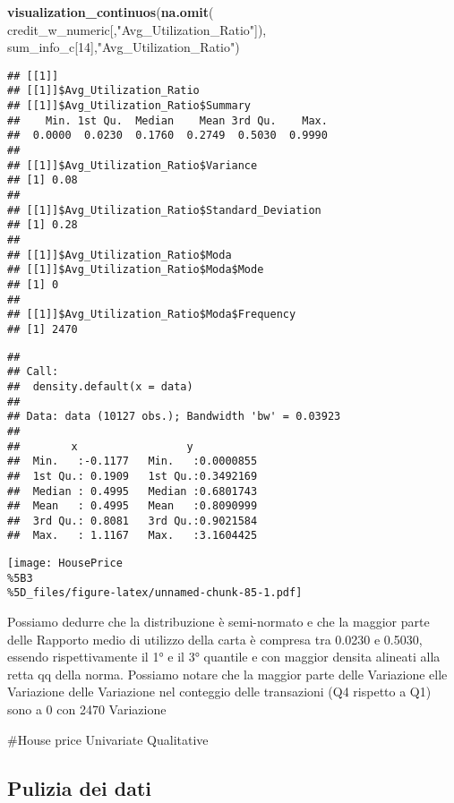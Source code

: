 \documentclass[
]{article}
\newenvironment{Shaded}{\begin{snugshade}}{\end{snugshade}}
\newcommand{\DecValTok}[1]{\textcolor[rgb]{0.00,0.00,0.81}{#1}}
\newcommand{\FunctionTok}[1]{\textcolor[rgb]{0.13,0.29,0.53}{\textbf{#1}}}
\newcommand{\NormalTok}[1]{#1}
\newcommand{\StringTok}[1]{\textcolor[rgb]{0.31,0.60,0.02}{#1}}
\begin{document}
\begin{Shaded}
\begin{Highlighting}[]
\FunctionTok{visualization\_continuos}\NormalTok{(}\FunctionTok{na.omit}\NormalTok{(}
\NormalTok{  credit\_w\_numeric[,}\StringTok{"Avg\_Utilization\_Ratio"}\NormalTok{]), sum\_info\_c[}\DecValTok{14}\NormalTok{],}\StringTok{"Avg\_Utilization\_Ratio"}\NormalTok{)}
\end{Highlighting}
\end{Shaded}

\begin{verbatim}
## [[1]]
## [[1]]$Avg_Utilization_Ratio
## [[1]]$Avg_Utilization_Ratio$Summary
##    Min. 1st Qu.  Median    Mean 3rd Qu.    Max. 
##  0.0000  0.0230  0.1760  0.2749  0.5030  0.9990 
## 
## [[1]]$Avg_Utilization_Ratio$Variance
## [1] 0.08
## 
## [[1]]$Avg_Utilization_Ratio$Standard_Deviation
## [1] 0.28
## 
## [[1]]$Avg_Utilization_Ratio$Moda
## [[1]]$Avg_Utilization_Ratio$Moda$Mode
## [1] 0
## 
## [[1]]$Avg_Utilization_Ratio$Moda$Frequency
## [1] 2470
\end{verbatim}

\begin{verbatim}
## 
## Call:
##  density.default(x = data)
## 
## Data: data (10127 obs.); Bandwidth 'bw' = 0.03923
## 
##        x                 y            
##  Min.   :-0.1177   Min.   :0.0000855  
##  1st Qu.: 0.1909   1st Qu.:0.3492169  
##  Median : 0.4995   Median :0.6801743  
##  Mean   : 0.4995   Mean   :0.8090999  
##  3rd Qu.: 0.8081   3rd Qu.:0.9021584  
##  Max.   : 1.1167   Max.   :3.1604425
\end{verbatim}

\texttt{[image: HousePrice\\\%5B3\\\%5D\_files/figure-latex/unnamed-chunk-85-1.pdf]}

Possiamo dedurre che la distribuzione è semi-normato e che la maggior
parte delle Rapporto medio di utilizzo della carta è compresa tra 0.0230
e 0.5030, essendo rispettivamente il 1° e il 3° quantile e con maggior
densita alineati alla retta qq della norma. Possiamo notare che la
maggior parte delle Variazione elle Variazione delle Variazione nel
conteggio delle transazioni (Q4 rispetto a Q1) sono a 0 con 2470
Variazione

\#House price Univariate Qualitative

\subsection{Pulizia dei dati}\label{pulizia-dei-dati}
\end{document}
